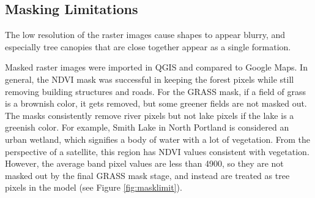 \documentclass[12pt,twoside]{reedthesis}
\begin{document}
\hypertarget{masking-limitations}{%
\subsection{Masking Limitations}\label{masking-limitations}}

The low resolution of the raster images cause shapes to appear blurry, and especially tree canopies that are close together appear as a single formation.

Masked raster images were imported in QGIS and compared to Google Maps. In general, the NDVI mask was successful in keeping the forest pixels while still removing building structures and roads. For the GRASS mask, if a field of grass is a brownish color, it gets removed, but some greener fields are not masked out. The masks consistently remove river pixels but not lake pixels if the lake is a greenish color. For example, Smith Lake in North Portland is considered an urban wetland, which signifies a body of water with a lot of vegetation. From the perspective of a satellite, this region has NDVI values consistent with vegetation. However, the average band pixel values are less than 4900, so they are not masked out by the final GRASS mask stage, and instead are treated as tree pixels in the model (see Figure \ref{fig:masklimit}).
\end{document}
